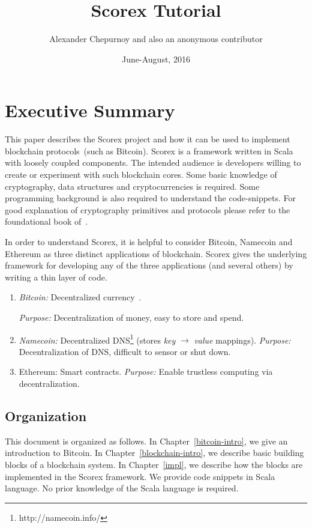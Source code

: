 \documentclass[]{report}   %
\begin{document}
\title{Scorex Tutorial}
\author{Alexander Chepurnoy and also an anonymous contributor}         
\date{June-August, 2016}
\maketitle

\chapter{Executive Summary}

This paper describes the Scorex project and how it can be used to implement blockchain protocols~(such as Bitcoin). Scorex is a framework written in Scala with loosely coupled components. 
The intended audience is developers willing to create or experiment with such blockchain cores. Some basic knowledge of cryptography, data structures and cryptocurrencies is required. Some programming background is also required to understand the code-snippets. For good explanation of cryptography primitives and protocols please refer to the foundational book of~\cite{katz2014introduction}. 

In order to understand Scorex, it is helpful to consider Bitcoin, Namecoin and Ethereum as three distinct applications of blockchain. Scorex gives the underlying framework for developing any of the three applications (and several others) by writing a thin layer of code. 

\begin{enumerate}
	\item {\em Bitcoin:} Decentralized currency~\cite{Nakamoto2008}.
	
		{\em Purpose:} Decentralization of money, easy to store and spend.		
	\item {\em Namecoin:} Decentralized DNS\footnote{http://namecoin.info/} (stores {\em key} $\rightarrow$ {\em value} mappings).
		{\em Purpose:} Decentralization of DNS, difficult to sensor or shut down.		
	\item {Ethereum:} Smart	contracts.	
	  {\em Purpose:} Enable trustless computing via decentralization.		
\end{enumerate}


\section{Organization}


This document is organized as follows. In Chapter~\ref{bitcoin-intro}, we give an introduction to Bitcoin. In Chapter~\ref{blockchain-intro}, we describe basic building blocks of a blockchain system. In Chapter~\ref{impl}, we describe how the blocks are implemented in the Scorex framework. We provide code snippets in Scala language. No prior knowledge of the Scala language is required.
\end{document}
